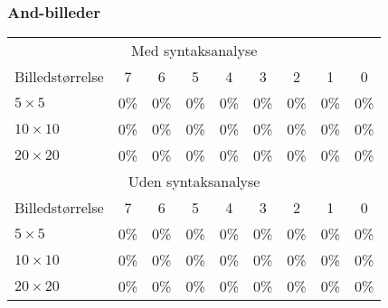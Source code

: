 \begin{comment}
\begin{tabular}{|l|c|c|c|}\hline
\rowcolor[gray]{0.9} \multicolumn{4}{|>{\columncolor[gray]{0.9}}c|}{\textbf{Træningssæt}} \\ \hline
Billedstørrelse & Alle tegn & Bogstaver & Tal \\\hline
$5 \times 5$ & 0\% & 0\% & 0\% \\\hline
$10 \times 10$ & 0\% & 0\% & 0\%\\\hline
$20 \times 20$ & 0\% & 0\% & 0\%\\\hline \end{tabular}

\begin{tabular}{|l|c|c|c|}\hline
\rowcolor[gray]{0.9} \multicolumn{4}{|>{\columncolor[gray]{0.9}}c|}{\textbf{Kontrolsæt}} \\ \hline
Billedstørrelse & Alle tegn & Bogstaver & Tal \\\hline
$5 \times 5$ & 0\% & 0\% & 0\% \\\hline
$10 \times 10$ & 0\% & 0\% & 0\%\\\hline
$20 \times 20$ & 0\% & 0\% & 0\%\\\hline \end{tabular}
\end{comment}

\subsubsection*{And-billeder}

\begin{tabular}{|l|c|c|c|c|c|c|c|c|}\hline
\rowcolor[gray]{0.9} \multicolumn{9}{|>{\columncolor[gray]{0.9}}c|}{\textbf{Træningssæt}} \\\hline
\multicolumn{9}{|c|}{Med syntaksanalyse}\\\hline
Billedstørrelse & 7 & 6 & 5 & 4 & 3 & 2 & 1 & 0\\\hline
$5 \times 5$ & 0\% & 0\% & 0\% & 0\% & 0\% & 0\% & 0\% & 0\% \\\hline
$10 \times 10$ & 0\% & 0\% & 0\% & 0\% & 0\% & 0\% & 0\% & 0\%\\\hline
$20 \times 20$ & 0\% & 0\% & 0\% & 0\% & 0\% & 0\% & 0\% & 0\%\\\hline 
\multicolumn{9}{|c|}{Uden syntaksanalyse}\\\hline
Billedstørrelse & 7 & 6 & 5 & 4 & 3 & 2 & 1 & 0\\\hline
$5 \times 5$ & 0\% & 0\% & 0\% & 0\% & 0\% & 0\% & 0\% & 0\% \\\hline
$10 \times 10$ & 0\% & 0\% & 0\% & 0\% & 0\% & 0\% & 0\% & 0\%\\\hline
$20 \times 20$ & 0\% & 0\% & 0\% & 0\% & 0\% & 0\% & 0\% & 0\%\\\hline \end{tabular}

